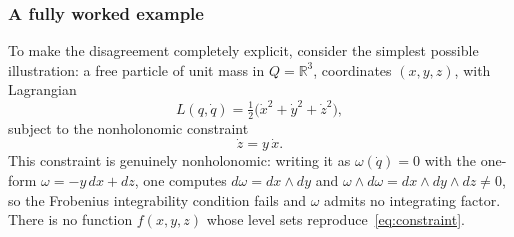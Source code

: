 \documentclass[11pt]{article}
\newcommand{\R}{\mathbb{R}}
\begin{document}
\subsubsection{A fully worked example}

To make the disagreement completely explicit, consider the simplest possible illustration: a free particle of unit mass in $Q = \R^3$, coordinates $(x,y,z)$, with Lagrangian
\begin{equation}
L(q,\dot q) = \tfrac12\big(\dot x^2 + \dot y^2 + \dot z^2\big),
\end{equation}
subject to the nonholonomic constraint
\begin{equation}
\label{eq:constraint}
\dot z = y\,\dot x .
\end{equation}
This constraint is genuinely nonholonomic: writing it as $\omega(\dot q) = 0$ with the one-form $\omega = -y\,dx + dz$, one computes $d\omega = dx\wedge dy$ and $\omega\wedge d\omega = dx\wedge dy \wedge dz \neq 0$, so the Frobenius integrability condition fails and $\omega$ admits no integrating factor. There is no function $f(x,y,z)$ whose level sets reproduce~\eqref{eq:constraint}.
\end{document}

